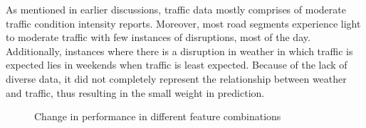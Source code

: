 As mentioned in earlier discussions, traffic data mostly comprises of moderate traffic condition intensity reports. Moreover, most road segments experience light to moderate traffic with few instances of disruptions, most of the day. Additionally, instances where there is a disruption in weather in which traffic is expected lies in weekends when traffic is least expected. Because of the lack of diverse data, it did not completely represent the relationship between weather and traffic, thus resulting in the small weight in prediction. 


\begin{figure}[h]
  \centering
  \captionsetup{justification=centering}
  \caption{Change in performance in different feature combinations}
  \label{fig:pm1-pm2-df-changes}
\end{figure}